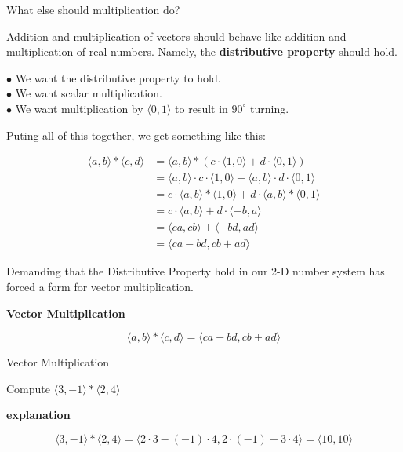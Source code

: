 \documentclass{ximera}
\begin{document}
What else should multiplication do? 


Addition and multiplication of vectors should behave like addition and multiplication of real numbers.  Namely, the \textbf{\textcolor{purple!85!blue}{distributive property}} should hold.


$\bullet$ We want the distributive property to hold.\\
$\bullet$ We want scalar multiplication.\\
$\bullet$ We want multiplication by $\langle 0, 1 \rangle$ to result in $90^{\circ}$ turning.

Puting all of this together, we get something like this:



\begin{align*}
\langle a, b \rangle  * \langle c, d \rangle & = \langle a, b \rangle  * (  c \cdot \langle 1, 0 \rangle    +  d \cdot \langle 0, 1 \rangle    )    \\
    & = \langle a, b \rangle \cdot c \cdot \langle 1, 0 \rangle     +      \langle a, b \rangle \cdot d \cdot \langle 0, 1 \rangle      \\
    & = c \cdot \langle a, b \rangle *  \langle 1, 0 \rangle     +    d \cdot  \langle a, b \rangle *  \langle 0, 1 \rangle      \\
    & = c \cdot \langle a, b \rangle   + d \cdot  \langle -b, a \rangle \\
    & =  \langle c a, c b \rangle   +   \langle -b d, a d \rangle \\
    & =  \langle c a - b d, c b + a d \rangle   
\end{align*} 




Demanding that the Distributive Property hold in our 2-D number system has forced a form for vector multiplication.


\begin{definition}  \textbf{\textcolor{green!50!black}{Vector Multiplication}}  


\[    \langle a, b \rangle  * \langle c, d \rangle =   \langle c a - b d, c b + a d \rangle   \]


\end{definition}








\begin{example} Vector Multiplication

Compute  $\langle 3, -1 \rangle  * \langle 2, 4 \rangle$

\textbf{\textcolor{red!75!green}{explanation}} 


\[
\langle 3, -1 \rangle  * \langle 2, 4 \rangle = \langle 2 \cdot 3 - (-1) \cdot 4, 2 \cdot (-1) + 3 \cdot 4 \rangle = \langle 10, 10 \rangle 
\]


\end{example}
\end{document}
